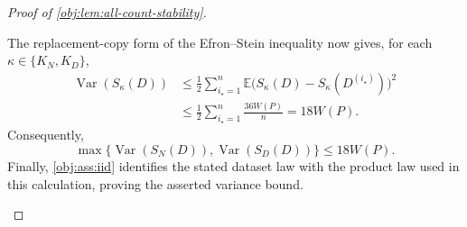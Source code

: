 \begin{proof}[Proof of \cref{obj:lem:all-count-stability}]
\begin{enumerate}
The replacement-copy form of the Efron--Stein inequality
\citep[Theorem 3.1, p.~54]{BoucheronLugosiMassart2013}
now gives, for each \(\kappa\in\{K_N,K_D\}\),
\[
\begin{aligned}
\operatorname{Var}(S_\kappa(D))
&\le\frac12\sum_{i_\star=1}^n
\mathbb E\bigl(S_\kappa(D)-S_\kappa(D^{(i_\star)})\bigr)^2\\
&\le\frac12\sum_{i_\star=1}^n\frac{36W(P)}n
=18W(P).
\end{aligned}
\]
Consequently,
\[
\max\{\operatorname{Var}(S_N(D)),\operatorname{Var}(S_D(D))\}
\le18W(P).
\]
Finally, \cref{obj:ass:iid} identifies the stated dataset law with the product law used in this calculation, proving the asserted variance bound.
\end{enumerate}
\end{proof}
